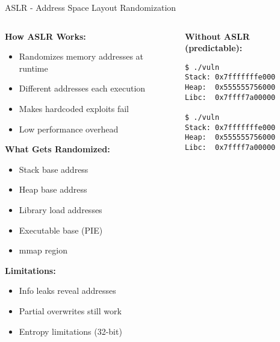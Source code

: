 \documentclass[aspectratio=169,12pt]{beamer}
\begin{document}
\begin{frame}[fragile]{ASLR - Address Space Layout Randomization}
    \begin{columns}
        \begin{column}{0.5\textwidth}
            \textbf{How ASLR Works:}
            \begin{itemize}
                \item Randomizes memory addresses at runtime
                \item Different addresses each execution
                \item Makes hardcoded exploits fail
                \item Low performance overhead
            \end{itemize}
            
            \vspace{0.3cm}
            \textbf{What Gets Randomized:}
            \begin{itemize}
                \item Stack base address
                \item Heap base address
                \item Library load addresses
                \item Executable base (PIE)
                \item mmap region
            \end{itemize}
            
            \vspace{0.3cm}
            \textbf{Limitations:}
            \begin{itemize}
                \item Info leaks reveal addresses
                \item Partial overwrites still work
                \item Entropy limitations (32-bit)
            \end{itemize}
        \end{column}
        \begin{column}{0.5\textwidth}
            \begin{tcolorbox}[colback=gray!10]
                \small
                \textbf{Without ASLR (predictable):}
                \begin{verbatim}
$ ./vuln
Stack: 0x7fffffffe000
Heap:  0x555555756000
Libc:  0x7ffff7a00000

$ ./vuln
Stack: 0x7fffffffe000
Heap:  0x555555756000
Libc:  0x7ffff7a00000
                \end{verbatim}
            \end{tcolorbox}
            

\end{column}
\end{columns}
\end{frame}
\end{document}
